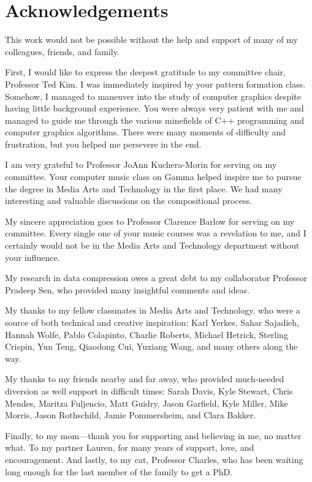 \chapter*{Acknowledgements}

{\singlespace
This work would not be possible without the help and support of many of my colleagues, friends, and family.

First, I would like to express the deepest gratitude to my committee chair, Professor Ted Kim. I was immediately inspired by your pattern formation class. Somehow, I managed to maneuver into the study of computer graphics despite having little background experience. You were always very patient with me and managed to guide me through the various minefields of C++ programming and computer graphics algorithms. There were many moments of difficulty and frustration, but you helped me persevere in the end.

I am very grateful to Professor JoAnn Kuchera-Morin for serving on my committee. Your computer music class on Gamma helped inspire me to pursue the degree in Media Arts and Technology in the first place. We had many interesting and valuable discussions on the compositional process. 

My sincere appreciation goes to Professor Clarence Barlow for serving on my committee. Every single one of your music courses was a revelation to me, and I certainly would not be in the Media Arts and Technology department without your influence. 

My research in data compression owes a great debt to my collaborator Professor Pradeep Sen, who provided many insightful comments and ideas.

My thanks to my fellow classmates in Media Arts and Technology, who were a source of both technical and creative inspiration: Karl Yerkes, Sahar Sajadieh, Hannah Wolfe, Pablo Colapinto, Charlie Roberts, Michael Hetrick, Sterling Crispin, Yun Teng, Qiaodong Cui, Yuxiang Wang, and many others along the way.

My thanks to my friends nearby and far away, who provided much-needed diversion as well support in difficult times: Sarah Davis, Kyle Stewart, Chris Mendes, Maritza Fuljencio, Matt Guidry, Jason Garfield, Kyle Miller, Mike Morris, 
Jason Rothschild, Jamie Pommersheim, and Clara Bakker.

Finally, to my mom---thank you for supporting and believing in me, no matter what. To my partner Lauren, for many years of support, love, and encouragement. And lastly, to my cat, Professor Charles, who has been waiting long enough for the last member of the family to get a PhD.
}

